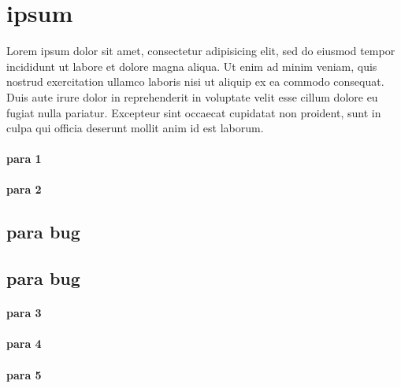 \documentclass[]{memoir}
\begin{document}
\section{ipsum}


Lorem ipsum dolor sit amet, consectetur adipisicing elit, sed do eiusmod
tempor incididunt ut labore et dolore magna aliqua. Ut enim ad minim veniam,
quis nostrud exercitation ullamco laboris nisi ut aliquip ex ea commodo
consequat. Duis aute irure dolor in reprehenderit in voluptate velit esse
cillum dolore eu fugiat nulla pariatur. Excepteur sint occaecat cupidatat non
proident, sunt in culpa qui officia deserunt mollit anim id est laborum.

\paragraph{para 1}
\paragraph{para 2}

\subsection{para bug}

\subsection{para bug}

\paragraph{para 3}
\paragraph{para 4}
\paragraph{para 5}

\end{document}
